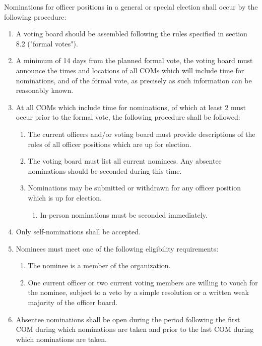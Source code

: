 \documentclass[11pt]{article}
\newcounter{h1}
\newcounter{h2}[h1]
\newcounter{h3}[h2]
\begin{document}

Nominations for officer positions in a general or special election shall occur by the following procedure:

\begin{enumerate}
  \item A voting board should be assembled following the rules specified in section 8.2 ("formal votes").  
  \item A minimum of 14 days from the planned formal vote, the voting board must announce the times and locations of all COMs which will include time for nominations, and of the formal vote, as precisely as such information can be reasonably known.  
  \item At all COMs which include time for nominations, of which at least 2 must occur prior to the formal vote, the following procedure shall be followed:  
  \begin{enumerate}
    \item The current officers and/or voting board must provide descriptions of the roles of all officer positions which are up for election.  
    \item The voting board must list all current nominees. Any absentee nominations should be seconded during this time.  
    \item Nominations may be submitted or withdrawn for any officer position which is up for election.  
    \begin{enumerate}
      \item In-person nominations must be seconded immediately.  
    \end{enumerate}
  \end{enumerate}
  \item Only self-nominations shall be accepted.  
  \item Nominees must meet one of the following eligibility requirements:  
  \begin{enumerate}
    \item The nominee is a member of the organization.  
    \item One current officer or two current voting members are willing to vouch for the nominee, subject to a veto by a simple resolution or a written weak majority of the officer board.  
  \end{enumerate}
  \item Absentee nominations shall be open during the period following the first COM during which nominations are taken and prior to the last COM during which nominations are taken.  

\end{enumerate}
\end{document}
